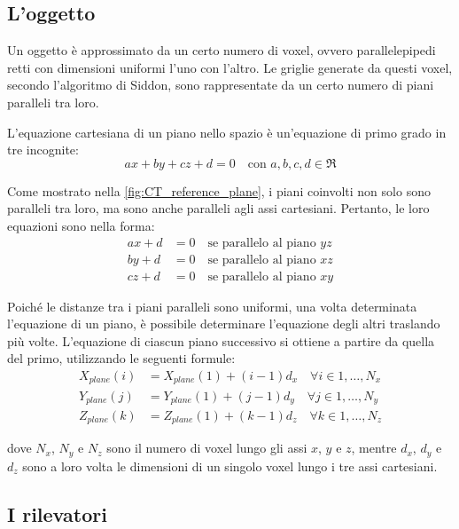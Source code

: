 \documentclass[12pt,a4paper]{report}
\begin{document}
\subsection{L'oggetto}

Un oggetto è approssimato da un certo numero di voxel, ovvero parallelepipedi retti con dimensioni uniformi l'uno con l'altro.
Le griglie generate da questi voxel, secondo l'algoritmo di Siddon, sono rappresentate da un certo numero di piani paralleli tra
loro.

L'equazione cartesiana di un piano nello spazio è un'equazione di primo grado in tre incognite:
\begin{equation*}
  ax + by + cz + d = 0 \quad \text{con } a, b, c, d \in \Re
\end{equation*}

Come mostrato nella \autoref{fig:CT_reference_plane}, i piani coinvolti non solo sono paralleli tra loro, ma sono anche paralleli
agli assi cartesiani.
Pertanto, le loro equazioni sono nella forma:
\begin{align*}
  ax + d &= 0 \quad \text{se parallelo al piano } yz \\
  by + d &= 0 \quad \text{se parallelo al piano } xz \\
  cz + d &= 0 \quad \text{se parallelo al piano } xy
\end{align*}

Poiché le distanze tra i piani paralleli sono uniformi, una volta determinata l'equazione di un piano, è possibile determinare
l'equazione degli altri traslando più volte.
L'equazione di ciascun piano successivo si ottiene a partire da quella del primo, utilizzando le seguenti formule:
\begin{align*}
  X_{plane}(i) &= X_{plane}(1) + (i - 1) d_x \quad \forall i \in 1, \dots, N_x \\
  Y_{plane}(j) &= Y_{plane}(1) + (j - 1) d_y \quad \forall j \in 1, \dots, N_y \\
  Z_{plane}(k) &= Z_{plane}(1) + (k - 1) d_z \quad \forall k \in 1, \dots, N_z
\end{align*}

dove \(N_x\), \(N_y\) e \(N_z\) sono il numero di voxel lungo gli assi \(x\), \(y\) e \(z\), mentre \(d_x\), \(d_y\) e \(d_z\)
sono a loro volta le dimensioni di un singolo voxel lungo i tre assi cartesiani.

\subsection{I rilevatori} \label{subsec:pixels}
\end{document}
